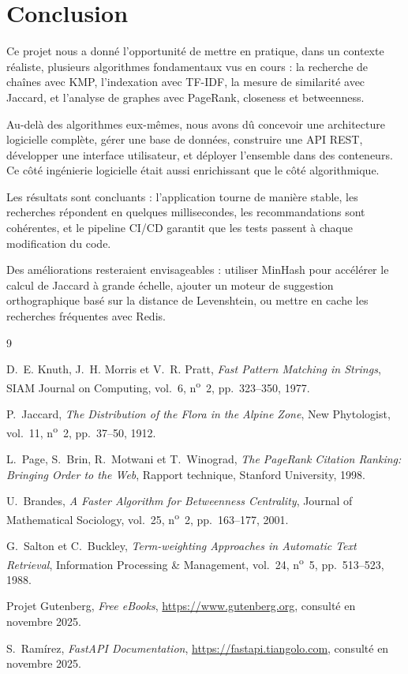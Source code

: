 \documentclass[12pt,a4paper]{article}
\begin{document}
\section{Conclusion}

Ce projet nous a donné l'opportunité de mettre en pratique, dans un contexte
réaliste, plusieurs algorithmes fondamentaux vus en cours : la recherche de
chaînes avec KMP, l'indexation avec TF-IDF, la mesure de similarité avec
Jaccard, et l'analyse de graphes avec PageRank, closeness et betweenness.

Au-delà des algorithmes eux-mêmes, nous avons dû concevoir une architecture
logicielle complète, gérer une base de données, construire une API REST,
développer une interface utilisateur, et déployer l'ensemble dans des conteneurs.
Ce côté \og ingénierie logicielle\fg{} était aussi enrichissant que le côté algorithmique.

Les résultats sont concluants : l'application tourne de manière stable,
les recherches répondent en quelques millisecondes, les recommandations sont
cohérentes, et le pipeline CI/CD garantit que les tests passent à chaque
modification du code.

Des améliorations resteraient envisageables : utiliser MinHash pour accélérer
le calcul de Jaccard à grande échelle, ajouter un moteur de suggestion
orthographique basé sur la distance de Levenshtein, ou mettre en cache les
recherches fréquentes avec Redis.

\begin{thebibliography}{9}

  D.~E. Knuth, J.~H. Morris et V.~R. Pratt,
  \textit{Fast Pattern Matching in Strings},
  SIAM Journal on Computing, vol.~6, n\textsuperscript{o}~2,
  pp.~323--350, 1977.

  P.~Jaccard,
  \textit{The Distribution of the Flora in the Alpine Zone},
  New Phytologist, vol.~11, n\textsuperscript{o}~2, pp.~37--50, 1912.

  L.~Page, S.~Brin, R.~Motwani et T.~Winograd,
  \textit{The PageRank Citation Ranking: Bringing Order to the Web},
  Rapport technique, Stanford University, 1998.

  U.~Brandes,
  \textit{A Faster Algorithm for Betweenness Centrality},
  Journal of Mathematical Sociology, vol.~25, n\textsuperscript{o}~2,
  pp.~163--177, 2001.

  G.~Salton et C.~Buckley,
  \textit{Term-weighting Approaches in Automatic Text Retrieval},
  Information Processing \& Management, vol.~24, n\textsuperscript{o}~5,
  pp.~513--523, 1988.

  Projet Gutenberg,
  \textit{Free eBooks},
  \url{https://www.gutenberg.org}, consulté en novembre 2025.

  S.~Ramírez,
  \textit{FastAPI Documentation},
  \url{https://fastapi.tiangolo.com}, consulté en novembre 2025.

\end{thebibliography}
\end{document}
